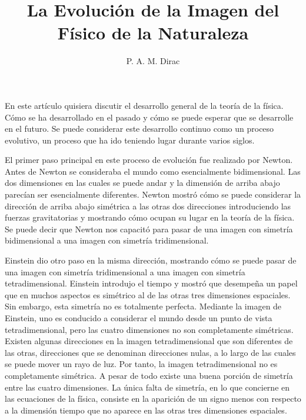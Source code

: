 \documentclass[a4paper, 12pt]{article}
\title{La Evolución de la Imagen del Físico de la Naturaleza}
\author{P. A. M. Dirac}
\date{}
\begin{document}
\begin{tcolorbox}[colback=blue!5!white,colframe=blue!75!black]

\vspace{-1.8cm}
\textbf \maketitle

\end{tcolorbox}

\bigskip


En este artículo quisiera discutir el desarrollo general de la teoría de la física. Cómo se ha desarrollado en el pasado y cómo se puede esperar que se desarrolle en el futuro. Se puede considerar este desarrollo continuo como un proceso evolutivo, un proceso que ha ido teniendo lugar durante varios siglos.

El primer paso principal en este proceso de evolución fue realizado por Newton. Antes de Newton se consideraba el mundo como esencialmente bidimensional. Las dos dimensiones en las cuales se puede andar y la dimensión de arriba abajo parecían ser  esencialmente diferentes. Newton mostró cómo se puede considerar la dirección de arriba abajo simétrica a las otras dos direcciones introduciendo las fuerzas gravitatorias y mostrando cómo ocupan su lugar en la teoría  de la física. Se puede decir que Newton nos capacitó para pasar de una imagen con simetría bidimensional a una imagen con simetría tridimensional.

Einstein dio otro paso en la misma dirección, mostrando cómo se puede pasar de una imagen con simetría tridimensional a una imagen con simetría tetradimensional. Einstein introdujo el tiempo y mostró que desempeña un papel que en muchos aspectos es simétrico al de las otras tres dimensiones espaciales. Sin embargo, esta simetría no es totalmente perfecta. Mediante la imagen de Einstein, uno es conducido a considerar el mundo desde un punto de vista tetradimensional, pero las cuatro dimensiones no son completamente simétricas. Existen algunas direcciones en la imagen tetradimensional que son diferentes de las otras, direcciones que se denominan direcciones nulas, a lo largo de las cuales se puede mover un rayo de luz. Por tanto, la imagen tetradimensional no es completamente simétrica. A pesar de  todo existe una buena porción de simetría entre las cuatro dimensiones. La única falta de simetría, en lo que concierne en las ecuaciones de la física, consiste en la aparición de un signo menos con respecto a la dimensión tiempo que no aparece en las otras tres dimensiones espaciales.
\end{document}
